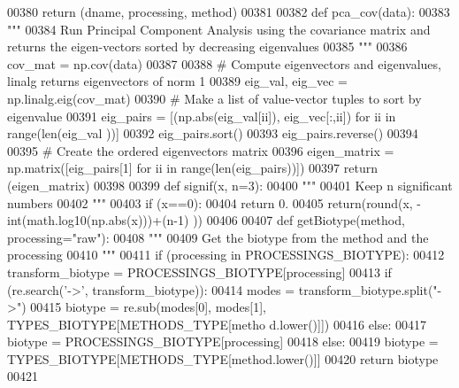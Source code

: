 \begin{DoxyCode}
00380     \textcolor{keywordflow}{return} (dname, processing, method)
00381 
00382 \textcolor{keyword}{def }pca\_cov(data):
00383     \textcolor{stringliteral}{"""}
00384 \textcolor{stringliteral}{    Run Principal Component Analysis using the covariance matrix and returns the 
      eigen-vectors sorted by decreasing eigenvalues}
00385 \textcolor{stringliteral}{    """}
00386     cov\_mat = np.cov(data)
00387 
00388     \textcolor{comment}{# Compute eigenvectors and eigenvalues, linalg returns eigenvectors of norm 1
      }
00389     eig\_val, eig\_vec = np.linalg.eig(cov\_mat)
00390     \textcolor{comment}{# Make a list of value-vector tuples to sort by eigenvalue}
00391     eig\_pairs = [(np.abs(eig\_val[ii]), eig\_vec[:,ii]) \textcolor{keywordflow}{for} ii \textcolor{keywordflow}{in} range(len(eig\_val
      ))]
00392     eig\_pairs.sort()
00393     eig\_pairs.reverse()
00394 
00395     \textcolor{comment}{# Create the ordered eigenvectors matrix}
00396     eigen\_matrix = np.matrix([eig\_pairs[1] \textcolor{keywordflow}{for} ii \textcolor{keywordflow}{in} range(len(eig\_pairs))])
00397     \textcolor{keywordflow}{return} (eigen\_matrix)
00398 
00399 \textcolor{keyword}{def }signif(x, n=3):
00400     \textcolor{stringliteral}{"""}
00401 \textcolor{stringliteral}{    Keep n significant numbers}
00402 \textcolor{stringliteral}{    """}
00403     \textcolor{keywordflow}{if} (x==0):
00404         \textcolor{keywordflow}{return} 0.
00405     \textcolor{keywordflow}{return}(round(x, -int(math.log10(np.abs(x)))+(n-1) ))
00406 
00407 \textcolor{keyword}{def }getBiotype(method, processing="raw"):
00408     \textcolor{stringliteral}{"""}
00409 \textcolor{stringliteral}{    Get the biotype from the method and the processing}
00410 \textcolor{stringliteral}{    """}
00411     \textcolor{keywordflow}{if} (processing \textcolor{keywordflow}{in} PROCESSINGS\_BIOTYPE):
00412         transform\_biotype = PROCESSINGS\_BIOTYPE[processing]
00413         \textcolor{keywordflow}{if} (re.search(\textcolor{stringliteral}{'->'}, transform\_biotype)):
00414             modes = transform\_biotype.split(\textcolor{stringliteral}{"->"})
00415             biotype = re.sub(modes[0], modes[1], TYPES\_BIOTYPE[METHODS\_TYPE[metho
      d.lower()]])
00416         \textcolor{keywordflow}{else}:
00417             biotype = PROCESSINGS\_BIOTYPE[processing]
00418     \textcolor{keywordflow}{else}:
00419         biotype = TYPES\_BIOTYPE[METHODS\_TYPE[method.lower()]]
00420     \textcolor{keywordflow}{return} biotype
00421 
\end{DoxyCode}
